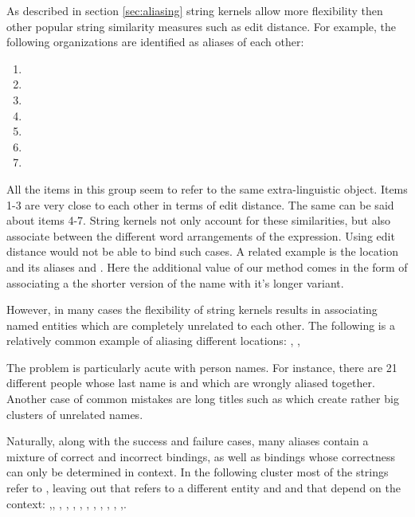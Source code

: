 As described in section \ref{sec:aliasing} string kernels allow more flexibility then other popular string similarity measures such as edit distance.
For example, the following organizations are identified as aliases of each other:
\begin{enumerate}
\item  {}
\item  {}
\item  {}
\item  {}
\item  {}
\item  {}
\item  {}
\end{enumerate}
All the items in this group seem to refer to the same extra-linguistic object. Items 1-3 are very close to each other in terms of edit distance.
The same can be said about items 4-7. String kernels not only account for these similarities, but also associate between the different word arrangements of the expression. Using edit distance would not be able to bind such cases. A related example is the location  and its aliases 
 and . Here the additional value of our method comes in the form of associating a the shorter version of the
name with it's longer variant. 

However, in many cases the flexibility of string kernels results in associating named entities which are completely unrelated to each other. The following is a relatively common example of aliasing different locations: , , 

The problem is particularly acute with person names. For instance, there are 21 different people whose last name is  and which are wrongly aliased together. Another case of common mistakes are long titles such as  which create rather big clusters of unrelated names.   
 
Naturally, along with the success and failure cases, many aliases contain a mixture of correct and incorrect bindings, as well as bindings whose correctness can only be determined in context. In the following cluster most of the strings refer to , leaving out  that refers to a different entity and  and  that depend on the context: ,, , , , , , , , , , ,.

